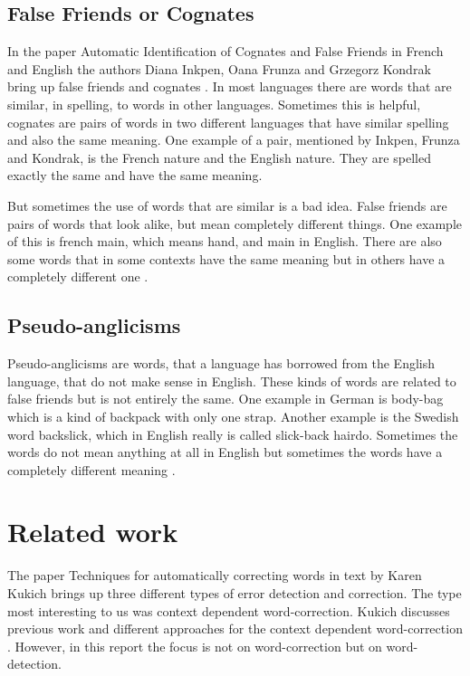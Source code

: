 \documentclass[a4paper,12pt]{article}
\begin{document}
\subsection{False Friends or Cognates}
In the paper Automatic Identification of Cognates and False Friends in French and English the authors Diana Inkpen, Oana Frunza and Grzegorz Kondrak bring up false friends and cognates \cite{frunzaInkpen2009identification}. In most languages there are words that are similar, in spelling, to words in other languages. Sometimes this is helpful, cognates are pairs of words in two different languages that have similar spelling and also the same meaning. One example of a pair, mentioned by Inkpen, Frunza and Kondrak, is the French nature and the English nature. They are spelled exactly the same and have the same meaning.

But sometimes the use of words that are similar is a bad idea. False friends are pairs of words that look alike, but mean completely different things. One example of this is french main, which means hand, and main in English. There are also some words that in some contexts have the same meaning but in others have a completely different one \cite{frunzaInkpen2009identification}.

\subsection{Pseudo-anglicisms}
Pseudo-anglicisms are words, that a language has borrowed from the English language, that do not make sense in English. These kinds of words are related to false friends but is not entirely the same. One example in German is body-bag which is a kind of backpack with only one strap. Another example is the Swedish word backslick, which in English really is called slick-back hairdo. Sometimes the words do not mean anything at all in English but sometimes the words have a completely different meaning \cite{pseudoanglicism}.

\section{Related work}
\label{sec:relatedwork}
The paper Techniques for automatically correcting words in text by Karen Kukich brings up three different types of error detection and correction. The type most interesting to us was context dependent word-correction. Kukich discusses previous work and different approaches for the context dependent word-correction \cite{Kukich1992Tecniques}. However, in this report the focus is not on word-correction but on word-detection.
\end{document}
